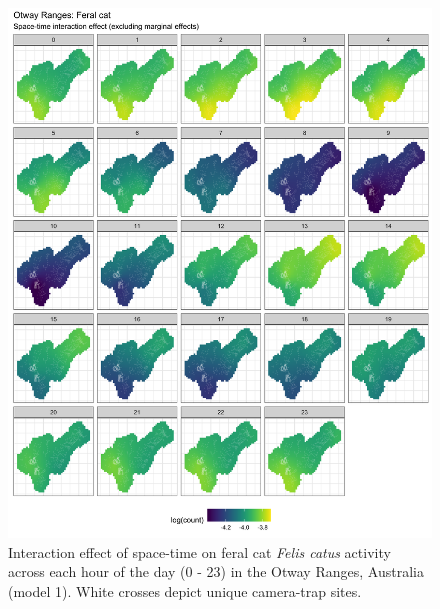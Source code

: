 \documentclass[11pt,a4paper,titlepage,twoside,openright]{style/unimelbthesis}
\begin{document}
\begin{mainmatter}
\begin{figure}
{\centering \includegraphics[width=1\linewidth]{figure/spte_diff_avg_o_cat} 

}

\caption{Interaction effect of space-time on feral cat \textit{Felis catus} activity across each hour of the day (0 - 23) in the Otway Ranges, Australia (model 1). White crosses depict unique camera-trap sites. }\label{fig:diel-st-int-o-cat}
\end{figure}
\newpage
\begin{figure}


\end{figure}
\end{mainmatter}
\end{document}
